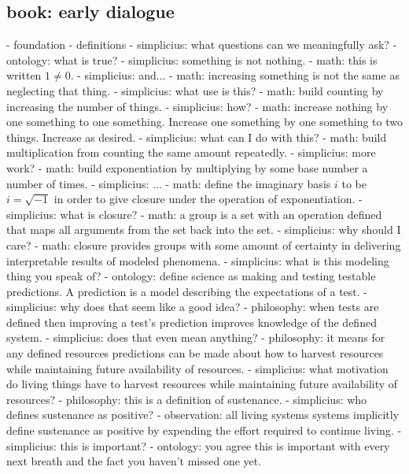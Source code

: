 \subsection*{ book: early dialogue }
- foundation
  - definitions
    - simplicius: what questions can we meaningfully ask?
    - ontology: what is true?
    - simplicius: something is not nothing.
    - math: this is written $1 \ne 0.$
    - simplicius: and...
    - math: increasing something is not the same as neglecting that thing.
    - simplicius: what use is this?
    - math: build counting by increasing the number of things.
    - simplicius: how?
    - math: increase nothing by one something to one something. Increase one something by one something to two things. Increase as desired.
    - simplicius: what can I do with this?
    - math: build multiplication from counting the same amount repeatedly.
    - simplicius: more work?
    - math: build exponentiation by multiplying by some base number a number of times.
    - simplicius: ...
    - math: define the imaginary basis $i$ to be $i=\sqrt{-1}$ in order to give closure under the operation of exponentiation.
    - simplicius: what is closure?
    - math: a group is a set with an operation defined that maps all arguments from the set back into the set.
    - simplicius: why should I care?
    - math: closure provides groups with some amount of certainty in delivering interpretable results of modeled phenomena.
    - simplicius: what is this modeling thing you speak of?
    - ontology: define science as making and testing testable predictions. A prediction is a model describing the expectations of a test.
    - simplicius: why does that seem like a good idea?
    - philosophy: when tests are defined then improving a test's prediction improves knowledge of the defined system.
    - simplicius: does that even mean anything?
    - philosophy: it means for any defined resources predictions can be made about how to harvest resources while maintaining future availability of resources.
    - simplicius: what motivation do living things have to harvest resources while maintaining future availability of resources?
    - philosophy: this is a definition of sustenance.
    - simplicius: who defines sustenance as positive?
    - observation: all living systems systems implicitly define sustenance as positive by expending the effort required to continue living.
    - simplicius: this is important?
    - ontology: you agree this is important with every next breath and the fact you haven't missed one yet.

\section*{  }

